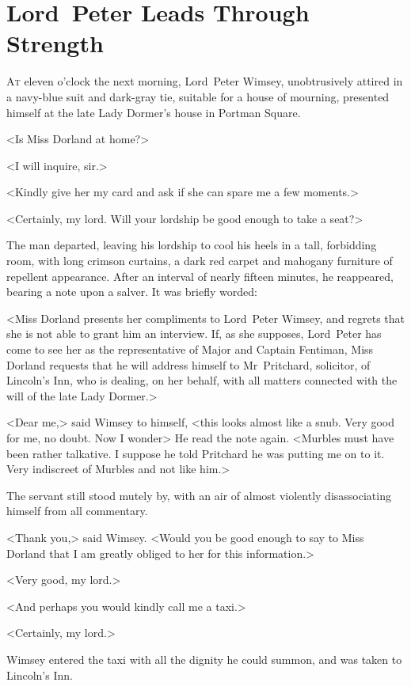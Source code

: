 \chapter{Lord~Peter Leads Through Strength}

\lettrine{A}{t} eleven o'clock the next morning, Lord~Peter Wimsey, unobtrusively attired in a navy-blue suit and dark-gray tie, suitable for a house of mourning, presented himself at the late Lady Dormer's house in Portman Square.

<Is Miss Dorland at home?>

<I will inquire, sir.>

<Kindly give her my card and ask if she can spare me a few moments.>

<Certainly, my lord. Will your lordship be good enough to take a seat?>

The man departed, leaving his lordship to cool his heels in a tall, forbidding room, with long crimson curtains, a dark red carpet and mahogany furniture of repellent appearance. After an interval of nearly fifteen minutes, he reappeared, bearing a note upon a salver. It was briefly worded:

<Miss Dorland presents her compliments to Lord~Peter Wimsey, and regrets that she is not able to grant him an interview. If, as she supposes, Lord~Peter has come to see her as the representative of Major and Captain Fentiman, Miss Dorland requests that he will address himself to Mr~Pritchard, solicitor, of Lincoln's Inn, who is dealing, on her behalf, with all matters connected with the will of the late Lady Dormer.>

<Dear me,> said Wimsey to himself, <this looks almost like a snub. Very good for me, no doubt. Now I wonder\longdash> He read the note again. <Murbles must have been rather talkative. I suppose he told Pritchard he was putting me on to it. Very indiscreet of Murbles and not like him.>

The servant still stood mutely by, with an air of almost violently disassociating himself from all commentary.

<Thank you,> said Wimsey. <Would you be good enough to say to Miss Dorland that I am greatly obliged to her for this information.>

<Very good, my lord.>

<And perhaps you would kindly call me a taxi.>

<Certainly, my lord.>

Wimsey entered the taxi with all the dignity he could summon, and was taken to Lincoln's Inn.

